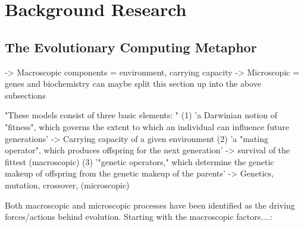 
\chapter{Background Research} %

\label{Chapter2} %


\section{The Evolutionary Computing Metaphor}


-> Macroscopic components = environment, carrying capacity
-> Microscopic = genes and biochemistry
can maybe split this section up into the above subsections

"These models consist of three basic elements: " \cite{de1988learning}
(1) 'a Darwinian notion of "fitness", which governs the extent to which an individual can influence future generations' -> Carrying capacity of a given environment
(2) 'a "mating operator", which produces offspring for the next generation' -> survival of the fittest (macroscopic)
(3) '"genetic operators," which determine the genetic makeup of offspring from the genetic makeup of the parents' -> Genetics, mutation, crossover, (microscopic)

Both macroscopic and microscopic processes have been identified as the driving forces/actions behind evolution. Starting with the macroscopic factors....:

